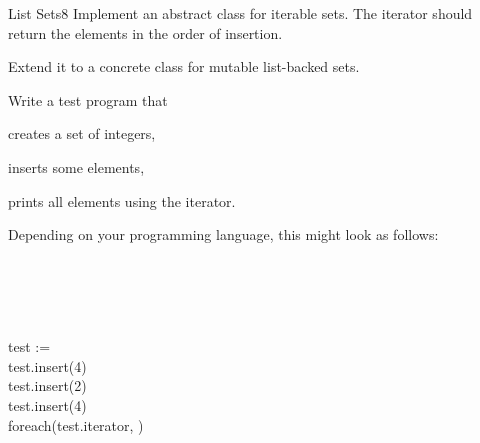 \documentclass[a4paper]{article}
\begin{document}
\header


\begin{problem}{List Sets}{8}
Implement an abstract class for iterable sets.
The iterator should return the elements in the order of insertion.

Extend it to a concrete class for mutable list-backed sets.

Write a test program that
\begin{compactitem}
\item creates a set of integers,
\item inserts some elements,
\item prints all elements using the iterator.
\end{compactitem}

Depending on your programming language, this might look as follows:
\begin{acode}
\\
\\
\\\\
test := \\
test.insert(4)\\
test.insert(2)\\
test.insert(4)\\
foreach(test.iterator, )
\end{acode}
\end{problem}
\end{document}
